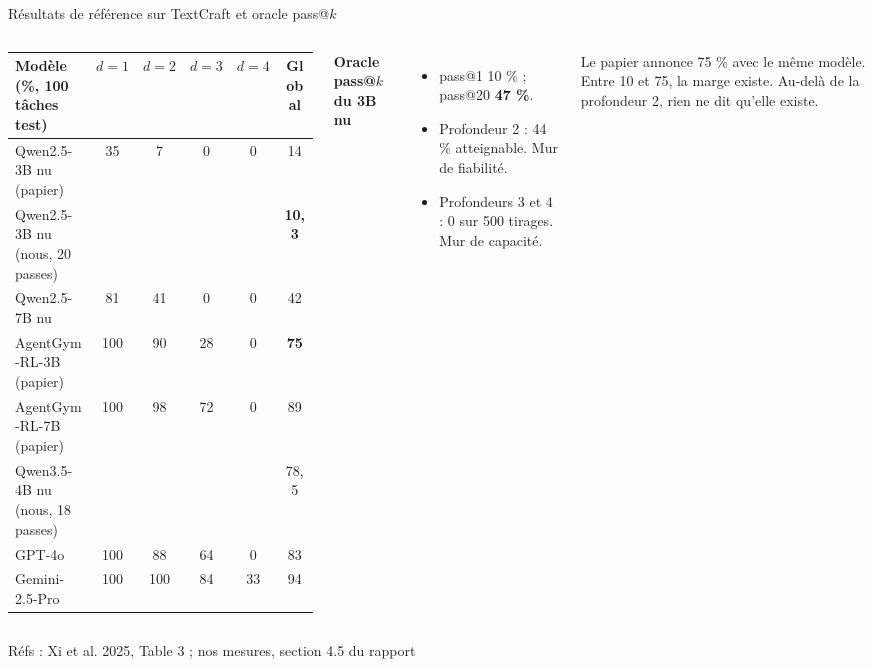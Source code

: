 \documentclass[aspectratio=169,10pt]{beamer}
\newcommand{\refs}[1]{\vfill{\tiny\textcolor{crMid}{Réfs : #1}}}
\newcommand{\hl}[1]{\textcolor{crOrange}{\textbf{#1}}}
\begin{document}
\begin{frame}{Résultats de référence sur TextCraft et oracle pass@$k$}
\begin{columns}[T]
\footnotesize\setlength{\tabcolsep}{3.5pt}
\begin{tabular}{@{}lccccc@{}}
\toprule
\textbf{Modèle (\%, 100 tâches test)} & $d{=}1$ & $d{=}2$ & $d{=}3$ & $d{=}4$ & \textbf{Global} \\
\midrule
Qwen2.5-3B nu (papier) & 35 & 7 & 0 & 0 & 14 \\
Qwen2.5-3B nu (nous, 20 passes) & & & & & \hl{10,3} \\
Qwen2.5-7B nu & 81 & 41 & 0 & 0 & 42 \\
\rowcolor{crGrey}AgentGym-RL-3B (papier) & 100 & 90 & 28 & 0 & \textbf{75} \\
AgentGym-RL-7B (papier) & 100 & 98 & 72 & 0 & 89 \\
Qwen3.5-4B nu (nous, 18 passes) & & & & & 78,5 \\
GPT-4o & 100 & 88 & 64 & 0 & 83 \\
Gemini-2.5-Pro & 100 & 100 & 84 & 33 & 94 \\
\bottomrule
\end{tabular}
\small
\textbf{Oracle pass@$k$ du 3B nu}
\begin{itemize}
  \item pass@1 10 \% ; pass@20 \hl{47 \%}.
  \item Profondeur 2 : 44 \% atteignable. Mur de fiabilité.
  \item Profondeurs 3 et 4 : 0 sur 500 tirages. Mur de capacité.
\end{itemize}
\vspace{0.2cm}
Le papier annonce 75 \% avec le même modèle. Entre 10 et 75, la marge existe. Au-delà de la profondeur 2, rien ne dit qu'elle existe.
\end{columns}
\refs{Xi et al. 2025, Table 3 ; nos mesures, section 4.5 du rapport}
\end{frame}
\end{document}

